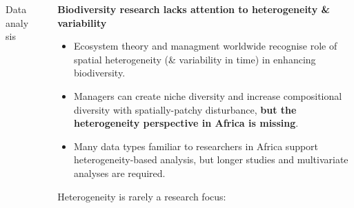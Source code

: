 \documentclass[final]{beamer}\usepackage[]{graphicx}\usepackage[]{color}
\newenvironment{knitrout}{}{} %
\newlength{\sepwid}
\newlength{\onecolwid}
\newlength{\twocolwid}
\begin{document}
\begin{frame}[t]
\begin{columns}[t]
\begin{column}{\twocolwid}
\begin{columns}[t,totalwidth=\twocolwid]
\begin{column}{0.38\textwidth}
\begin{block}{Data analysis}
\begin{knitrout}
\end{knitrout}

\end{block}
\end{column} %
\end{columns} %


\end{column} %

\begin{column}{\sepwid}\end{column} %

\begin{column}{\onecolwid} %


\begin{alertblock}{\textbf{Biodiversity research lacks attention to heterogeneity \& variability}}

\begin{itemize}
\item Ecosystem theory and managment worldwide recognise role of spatial heterogeneity (\& variability in time) in enhancing biodiversity. 
\item Managers can create niche diversity and increase compositional diversity with spatially-patchy disturbance, \textbf{but the heterogeneity perspective in Africa is missing}.
\item Many data types familiar to researchers in Africa support heterogeneity-based analysis, but longer studies and multivariate analyses are required.
\end{itemize}

\end{alertblock}

Heterogeneity is rarely a research focus:

\begin{knitrout}
\color{fgcolor}


\end{knitrout}
\end{column}
\end{columns}
\end{frame}
\end{document}
